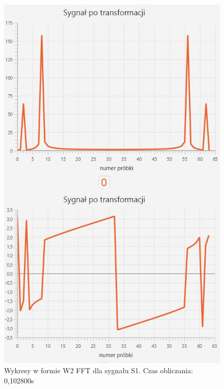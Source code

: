 \documentclass[12pt]{article}
\begin{document}
\begin{figure}[H]
	\centering
	\includegraphics[width=.8\linewidth]{FFT-S1-W2}
	\caption{Wykresy w formie W2 FFT dla sygnału S1. Czas obliczania: 0,102800s}
	\label{S3_sygnal}
\end{figure}
\end{document}
